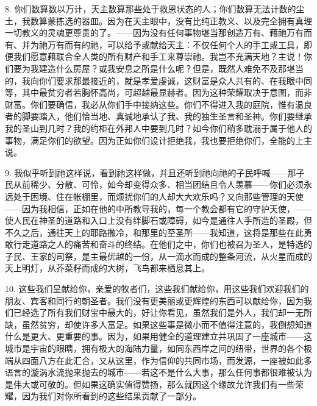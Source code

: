 8. 你们数算数以万计，天主数算那些处于救恩状态的人；你们数算无法计数的尘土，我数算蒙拣选的器皿。因为在天主眼中，没有比纯正教义、以及完全拥有真理一切教义的灵魂更尊贵的了。——因为没有任何事物堪当那创造万有、藉祂万有而有、并为祂万有而有的祂，可以给予或献给天主：不仅任何个人的手工或工具，即便我们愿意藉联合全人类的所有财产和手工来尊崇祂。我岂不充满天地？主说！你们要为我建造什么房屋？或我安息之所是什么呢？但是，既然人难免不及那堪当的，我向你们要求那最接近的，就是孝爱虔诚，这财富是众人共有的、在我眼中同等，其中最贫穷者若胸怀高尚，可超越最显赫者。因为这种荣耀取决于意图，而非财富。你们要确信，我必从你们手中接纳这些。你们不得进入我的庭院，惟有温良者的脚要踏入，他们恰当地、真诚地承认了我、我的独生圣言和圣神。你们要继承我的圣山到几时？我的约柜在外邦人中要到几时？如今你们稍多耽溺于属于他人的事物，满足你们的欲望。因为正如你们设计拒绝我，我也要拒绝你们，全能的上主说。\par

9. 我似乎听到祂这样说，看到祂这样做，并且还听到祂向祂的子民呼喊——那子民从前稀少、分散、可怜，如今却变得众多、相当团结且令人羡慕——你们必须永远处于困境、住在帐棚里，而烦扰你们的人却大大欢乐吗？又向那些管理的天使——因为我相信，正如在他的中所教导我的，每一个教会都有它的守护天使，——使人民在神圣的道路和入口上没有绊脚石或障碍，如今是通往人手所造的圣殿，但不久之后，通往天上的耶路撒冷，和那里的至圣所——我知道，这将是那些在此勇敢行走道路之人的痛苦和奋斗的终结。在他们之中，你们也被召为圣人，是特选的子民、王家的司祭，是主最优越的一份，从一滴水而成的整条河流，从火星而成的天上明灯，从芥菜籽而成的大树，飞鸟都来栖息其上。\par

10. 这些我们呈献给你，亲爱的牧者们，这些我们献给你，用这些我们欢迎我们的朋友、宾客和同行的朝圣者。我们没有更美丽或更辉煌的东西可以献给你，因为我们已经选了所有我们财宝中最大的，好让你看见，虽然我们是外人，我们却一无所缺，虽然贫穷，却使许多人富足。如果这些事是微小而不值得注意的，我倒想知道什么是更大、更重要的事。因为，如果用健全的道理建立并巩固了一座城市——这城市是宇宙的眼睛，拥有极大的海陆力量，如同东西岸之间的纽带，世界的各个极端从四面八方在此汇合，又从这里，作为信仰的共同市场，而发源，一座被如此多语言的漩涡水流抛来抛去的城市——若这不是什么大事，那么任何事都很难被认为是伟大或可敬的。但如果这确实值得赞扬，那么就因这个缘故允许我们有一些荣耀，因为我们对你所看到的这些结果贡献了一部分。\par

